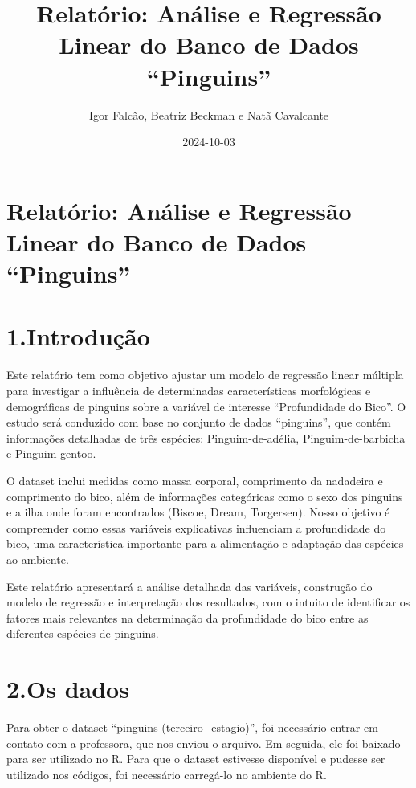 \documentclass[
  letterpaper,
  DIV=11,
  numbers=noendperiod]{scrartcl}
\title{Relatório: Análise e Regressão Linear do Banco de Dados
``Pinguins''}
\author{Igor Falcão, Beatriz Beckman e Natã Cavalcante}
\date{2024-10-03}
\begin{document}
\maketitle


\section{Relatório: Análise e Regressão Linear do Banco de Dados
``Pinguins''}\label{relatuxf3rio-anuxe1lise-e-regressuxe3o-linear-do-banco-de-dados-pinguins}

\section{1.Introdução}\label{introduuxe7uxe3o}

Este relatório tem como objetivo ajustar um modelo de regressão linear
múltipla para investigar a influência de determinadas características
morfológicas e demográficas de pinguins sobre a variável de interesse
``Profundidade do Bico''. O estudo será conduzido com base no conjunto
de dados ``pinguins'', que contém informações detalhadas de três
espécies: Pinguim-de-adélia, Pinguim-de-barbicha e Pinguim-gentoo.

O dataset inclui medidas como massa corporal, comprimento da nadadeira e
comprimento do bico, além de informações categóricas como o sexo dos
pinguins e a ilha onde foram encontrados (Biscoe, Dream, Torgersen).
Nosso objetivo é compreender como essas variáveis explicativas
influenciam a profundidade do bico, uma característica importante para a
alimentação e adaptação das espécies ao ambiente.

Este relatório apresentará a análise detalhada das variáveis, construção
do modelo de regressão e interpretação dos resultados, com o intuito de
identificar os fatores mais relevantes na determinação da profundidade
do bico entre as diferentes espécies de pinguins.

\section{2.Os dados}\label{os-dados}

Para obter o dataset ``pinguins (terceiro\_estagio)'', foi necessário
entrar em contato com a professora, que nos enviou o arquivo. Em
seguida, ele foi baixado para ser utilizado no R. Para que o dataset
estivesse disponível e pudesse ser utilizado nos códigos, foi necessário
carregá-lo no ambiente do R.
\end{document}
